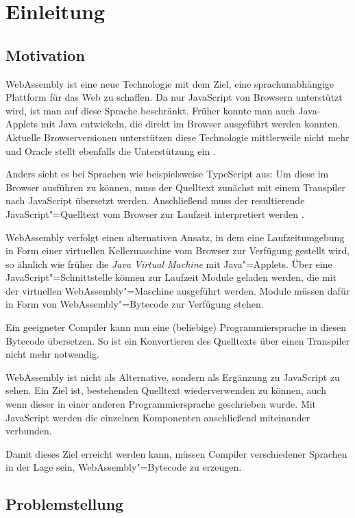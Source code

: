 \chapter{Einleitung}

\section{Motivation}

WebAssembly \cite{WebAssemblyWebsite} ist eine neue Technologie mit dem Ziel, eine sprachunabhängige Plattform für das Web zu schaffen. Da nur JavaScript von Browsern unterstützt wird, ist man auf diese Sprache beschränkt. Früher konnte man auch Java-Applets mit Java entwickeln, die direkt im Browser ausgeführt werden konnten. Aktuelle Browserversionen unterstützen diese Technologie mittlerweile nicht mehr und Oracle stellt ebenfalls die Unterstützung ein \cite{OracleJavaSESupportRoadmap}.

Anders sieht es bei Sprachen wie beispielsweise TypeScript aus: Um diese im Browser ausführen zu können, muss der Quelltext zunächst mit einem Transpiler nach JavaScript übersetzt werden. Anschließend muss der resultierende JavaScript"=Quelltext vom Browser zur Laufzeit interpretiert werden \cite{TypeScript}.

WebAssembly verfolgt einen alternativen Ansatz, in dem eine Laufzeitumgebung in Form einer virtuellen Kellermaschine vom Browser zur Verfügung gestellt wird, so ähnlich wie früher die \emph{Java Virtual Machine} mit Java"=Applets. Über eine JavaScript"=Schnittstelle können zur Laufzeit Module geladen werden, die mit der virtuellen WebAssembly"=Maschine ausgeführt werden. Module müssen dafür in Form von WebAssembly"=Bytecode zur Verfügung stehen.

Ein geeigneter Compiler kann nun eine (beliebige) Programmiersprache in diesen Bytecode übersetzen. So ist ein Konvertieren des Quelltexts über einen Transpiler nicht mehr notwendig.

WebAssembly ist nicht als Alternative, sondern als Ergänzung zu JavaScript zu sehen. Ein Ziel ist, bestehenden Quelltext wiederverwenden zu können, auch wenn dieser in einer anderen Programmiersprache geschrieben wurde. Mit JavaScript werden die einzelnen Komponenten anschließend miteinander verbunden.

Damit dieses Ziel erreicht werden kann, müssen Compiler verschiedener Sprachen in der Lage sein, WebAssembly"=Bytecode zu erzeugen.

\section{Problemstellung}

